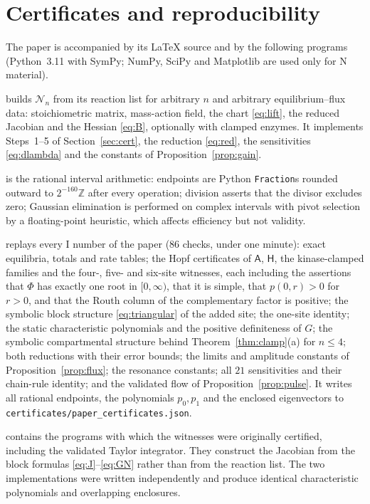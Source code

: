 \documentclass[11pt,a4paper]{article}
\theoremstyle{plain}
\theoremstyle{definition}
\theoremstyle{remark}
\newcommand{\cN}{\mathcal N}
\newcommand{\WA}{\mathsf A}
\newcommand{\WH}{\mathsf H}
\newcommand{\evI}{\textsf{I}}
\newcommand{\evN}{\textsf{N}}
\begin{document}
\section{Certificates and reproducibility}\label{app:cert}
The paper is accompanied by its \LaTeX{} source and by the following programs (Python~3.11 with SymPy; NumPy, SciPy and Matplotlib are used only for \evN{} material).
\begin{description}[leftmargin=1.5em,itemsep=2pt]
\item[\texttt{phos.py}] builds $\cN_n$ from its reaction list for arbitrary $n$ and arbitrary equilibrium--flux data: stoichiometric matrix, mass-action field, the chart \eqref{eq:lift}, the reduced Jacobian and the Hessian \eqref{eq:B}, optionally with clamped enzymes. It implements Steps~1--5 of Section~\ref{sec:cert}, the reduction \eqref{eq:red}, the sensitivities \eqref{eq:dlambda} and the constants of Proposition~\ref{prop:gain}.
\item[\texttt{interval\_arithmetic.py}] is the rational interval arithmetic: endpoints are Python \texttt{Fraction}s rounded outward to $2^{-160}\mathbb Z$ after every operation; division asserts that the divisor excludes zero; Gaussian elimination is performed on complex intervals with pivot selection by a floating-point heuristic, which affects efficiency but not validity.
\item[\texttt{check\_paper.py}] replays every \evI{} number of the paper (86 checks, under one minute): exact equilibria, totals and rate tables; the Hopf certificates of $\WA$, $\WH$, the kinase-clamped families and the four-, five- and six-site witnesses, each including the assertions that $\Phi$ has exactly one root in $[0,\infty)$, that it is simple, that $p(0,r)>0$ for $r>0$, and that the Routh column of the complementary factor is positive; the symbolic block structure \eqref{eq:triangular} of the added site; the one-site identity; the static characteristic polynomials and the positive definiteness of $G$; the symbolic compartmental structure behind Theorem~\ref{thm:clamp}(a) for $n\le4$; both reductions with their error bounds; the limits and amplitude constants of Proposition~\ref{prop:flux}; the resonance constants; all $21$ sensitivities and their chain-rule identity; and the validated flow of Proposition~\ref{prop:pulse}. It writes all rational endpoints, the polynomials $p_0,p_1$ and the enclosed eigenvectors to \texttt{certificates/paper\_certificates.json}.
\item[\texttt{workspace\_certificates/}] contains the programs with which the witnesses were originally certified, including the validated Taylor integrator. They construct the Jacobian from the block formulas \eqref{eq:J}--\eqref{eq:GN} rather than from the reaction list. The two implementations were written independently and produce identical characteristic polynomials and overlapping enclosures.

\end{description}
\end{document}
